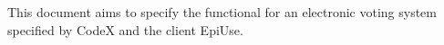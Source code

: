 This document aims to specify the functional for an electronic voting system specified by CodeX and the client EpiUse.